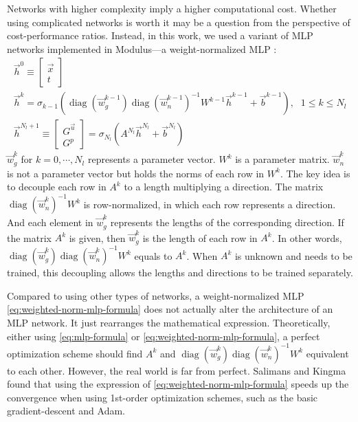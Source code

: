 Networks with higher complexity imply a higher computational cost.
Whether using complicated networks is worth it may be a question from the perspective of cost-performance ratios.
Instead, in this work, we used a variant of MLP networks implemented in Modulus---a weight-normalized MLP \cite{salimans_weight_2016}:
\begin{equation}\label{eq:weighted-norm-mlp-formula}
    \begin{array}{ll}
        \vec{h}^0 \equiv \begin{bmatrix} \vec{x} \\ t \end{bmatrix} & \\
        \vec{h}^k = \sigma_{k-1}\left(
            \operatorname{diag}\left(\vec{w}_g^{k-1}\right)
            \operatorname{diag}\left(\vec{w}_n^{k-1}\right)^{-1}
            W^{k-1}\vec{h}^{k-1}+\vec{b}^{k-1}
        \right)\text{,} & 1 \le k \le N_l \\
        \vec{h}^{N_l+1}\equiv \begin{bmatrix} G^{\vec{u}} \\ G^p \end{bmatrix} = \sigma_{N_l}\left(A^{N_l}\vec{h}^{N_l}+\vec{b}^{N_l}\right) &
    \end{array}
\end{equation}
$\vec{w}_g^{k}$ for $k=0,\cdots,N_l$ represents a parameter vector.
$W^k$ is a parameter matrix.
$\vec{w}_n^{k}$ is not a parameter vector but holds the norms of each row in $W^k$.
The key idea is to decouple each row in $A^k$ to a length multiplying a direction.
The matrix $\operatorname{diag}\left(\vec{w}_n^k\right)^{-1}W^k$ is row-normalized, in which each row represents a direction.
And each element in $\vec{w}_g^k$ represents the lengths of the corresponding direction.
If the matrix $A^k$ is given, then $\vec{w}_g^k$ is the length of each row in $A^k$.
In other words, $\operatorname{diag}\left(\vec{w}_g^{k}\right) \operatorname{diag}\left(\vec{w}_n^{k}\right)^{-1} W^{k}$ equals to $A^k$.
When $A^k$ is unknown and needs to be trained, this decoupling allows the lengths and directions to be trained separately.

Compared to using other types of networks, a weight-normalized MLP \eqref{eq:weighted-norm-mlp-formula} does not actually alter the architecture of an MLP network.
It just rearranges the mathematical expression.
Theoretically, either using \eqref{eq:mlp-formula} or \eqref{eq:weighted-norm-mlp-formula}, a perfect optimization scheme should find $A^k$ and $\operatorname{diag}\left(\vec{w}_g^{k}\right) \operatorname{diag}\left(\vec{w}_n^{k}\right)^{-1} W^{k}$ equivalent to each other.
However, the real world is far from perfect.
Salimans and Kingma \cite{salimans_weight_2016} found that using the expression of \eqref{eq:weighted-norm-mlp-formula} speeds up the convergence when using 1st-order optimization schemes, such as the basic gradient-descent and Adam.

